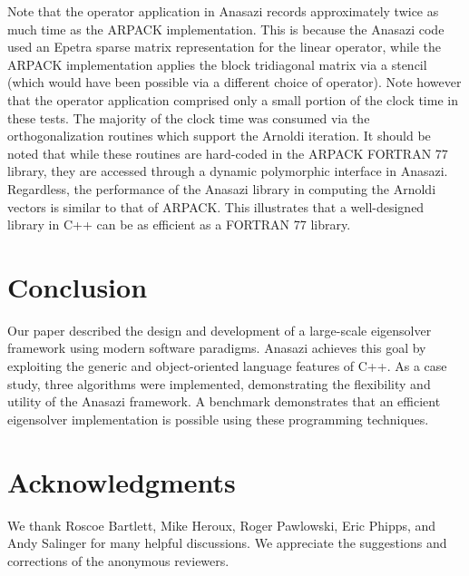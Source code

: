 \documentclass[acmtoms,acmnow]{acmtrans2m}
\begin{document}
Note that the operator application in Anasazi records approximately twice as much time as the ARPACK
implementation. This is because the Anasazi code used an Epetra sparse matrix
representation for the linear operator, while the ARPACK implementation applies the block
tridiagonal matrix via a stencil (which would have been possible via a different choice of
operator). Note however that the operator application comprised only a small portion of the clock
time in these tests. The majority of the clock time was consumed via the orthogonalization
routines which support the Arnoldi iteration. It should be noted that while these routines
are hard-coded in the ARPACK FORTRAN 77 library, they are accessed through a dynamic
polymorphic interface in Anasazi. Regardless, the performance of the Anasazi library in
computing the Arnoldi vectors is similar to that of ARPACK. This illustrates that a
well-designed library in C++ can be as efficient as a FORTRAN 77 library.

\section{Conclusion}

Our paper described the design and development of a large-scale eigensolver framework
using modern software paradigms. Anasazi achieves this goal by exploiting the generic and
object-oriented language features of C++. As a case study, three algorithms were
implemented, demonstrating the flexibility and utility of the Anasazi framework. A
benchmark demonstrates that an efficient eigensolver implementation is possible using
these programming techniques. 

\section{Acknowledgments}

We thank Roscoe Bartlett, Mike Heroux, Roger Pawlowski, Eric Phipps, and Andy Salinger for
many helpful discussions. We appreciate the suggestions and corrections of the anonymous
reviewers.





\begin{received}
\end{received}
\end{document}
